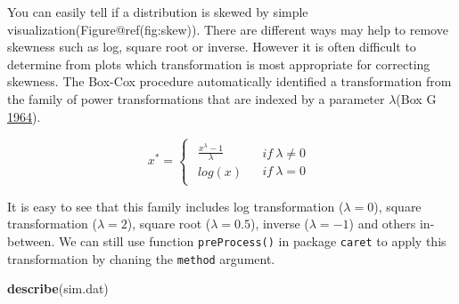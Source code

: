 \documentclass[
]{article}
\newenvironment{Shaded}{\begin{snugshade}}{\end{snugshade}}
\newcommand{\KeywordTok}[1]{\textcolor[rgb]{0.13,0.29,0.53}{\textbf{#1}}}
\newcommand{\NormalTok}[1]{#1}
\begin{document}
You can easily tell if a distribution is skewed by simple
visualization(Figure@ref(fig:skew)). There are different ways may help
to remove skewness such as log, square root or inverse. However it is
often difficult to determine from plots which transformation is most
appropriate for correcting skewness. The Box-Cox procedure automatically
identified a transformation from the family of power transformations
that are indexed by a parameter \(\lambda\)(Box G
\protect\hyperlink{ref-BOXCOX1}{1964}).

\[
x^{*}=\begin{cases}
\begin{array}{c}
\frac{x^{\lambda}-1}{\lambda}\\
log(x)
\end{array} & \begin{array}{c}
if\ \lambda\neq0\\
if\ \lambda=0
\end{array}\end{cases}
\]

It is easy to see that this family includes log transformation
(\(\lambda=0\)), square transformation (\(\lambda=2\)), square root
(\(\lambda=0.5\)), inverse (\(\lambda=-1\)) and others in-between. We
can still use function \texttt{preProcess()} in package \texttt{caret}
to apply this transformation by chaning the \texttt{method} argument.

\begin{Shaded}
\begin{Highlighting}[]
\KeywordTok{describe}\NormalTok{(sim.dat)}
\end{Highlighting}
\end{Shaded}
\end{document}
